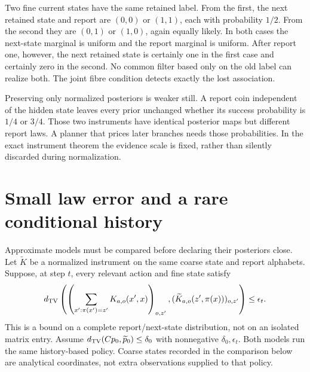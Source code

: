 \begin{counterexample}\label{ce:joint-marginals}
Two fine current states have the same retained label. From the first, the next retained state and report are $(0,0)$ or $(1,1)$, each with probability $1/2$. From the second they are $(0,1)$ or $(1,0)$, again equally likely. In both cases the next-state marginal is uniform and the report marginal is uniform. After report one, however, the next retained state is certainly one in the first case and certainly zero in the second. No common filter based only on the old label can realize both. The joint fibre condition detects exactly the lost association.
\end{counterexample}

Preserving only normalized posteriors is weaker still. A report coin independent of the hidden state leaves every prior unchanged whether its success probability is $1/4$ or $3/4$. Those two instruments have identical posterior maps but different report laws. A planner that prices later branches needs those probabilities. In the exact instrument theorem the evidence scale is fixed, rather than silently discarded during normalization.

\section{Small law error and a rare conditional history}
Approximate models must be compared before declaring their posteriors close. Let $\widetilde K$ be a normalized instrument on the same coarse state and report alphabets. Suppose, at step $t$, every relevant action and fine state satisfy
\[
 d_{\mathrm{TV}}\left(\left(\sum_{x':\pi(x')=z'}K_{a,o}(x',x)\right)_{o,z'},
             (\widetilde K_{a,o}(z',\pi(x)))_{o,z'}\right)\le\epsilon_t.
\]
This is a bound on a complete report/next-state distribution, not on an isolated matrix entry. Assume $d_{\mathrm{TV}}(Cp_0,\widetilde p_0)\le\delta_0$ with nonnegative $\delta_0,\epsilon_t$. Both models run the same history-based policy. Coarse states recorded in the comparison below are analytical coordinates, not extra observations supplied to that policy.

